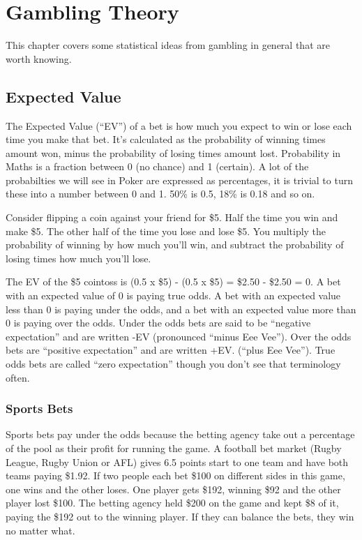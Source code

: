 \chapter{Gambling Theory}


This chapter covers some statistical ideas from gambling in general that
are worth knowing.

\section{Expected Value}

The Expected Value (``EV'') of a bet is how much you expect to win or lose
each time you make that bet. It's calculated as the probability of
winning times amount won, minus the probability of losing times amount
lost. Probability in Maths is a fraction between 0 (no chance)
and 1 (certain). A lot of the probabilties we will see in Poker
are expressed as percentages, it is trivial to turn these into a number
between 0 and 1. 50\% is 0.5, 18\% is 0.18 and so on.

Consider flipping a coin against your friend
for \$5. Half the time you win and make \$5. The other half of the
time you lose and lose \$5. You multiply the probability of winning
by how much you'll win, and subtract the probability of losing times
how much you'll lose.

The EV of the \$5 cointoss is (0.5 x \$5) - (0.5 x \$5)
= \$2.50 - \$2.50 = 0. A bet with an expected value of 0 is
paying true odds. A bet with an expected value less than 0 is
paying under the odds, and a bet with an expected value more than
0 is paying over the odds. Under the odds bets are said to be
``negative expectation'' and are written -EV (pronounced ``minus Eee Vee'').
Over the odds bets are ``positive expectation'' and are written +EV.
(``plus Eee Vee''). True odds bets are called ``zero expectation''
though you don't see that terminology often.

\subsection*{Sports Bets}
Sports bets pay under the odds because the betting agency take out a percentage
of the pool as their profit for running the game. A football bet market
(Rugby League, Rugby Union or AFL) gives 6.5 points start
to one team and have both teams paying \$1.92. If two people each bet \$100 on
different sides in this game, one wins and the other loses. One
player gets \$192, winning \$92 and the other player lost \$100. The
betting agency held \$200 on the game and kept \$8 of it, paying
the \$192 out to the winning player. If they can balance the bets,
they win no matter what.

